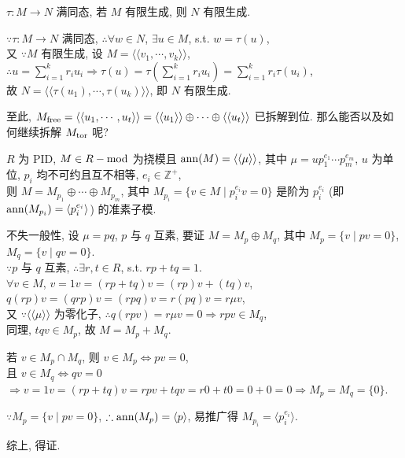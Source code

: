 \documentclass{note}
\begin{document}
\begin{cor}\label{cor-1 for thm-6.8}
    $\tau:M\rightarrow N$ 满同态, 若 $M$ 有限生成, 则 $N$ 有限生成.
\end{cor}
\begin{pf}
    $\because\tau:M\rightarrow N$ 满同态, $\therefore\forall w\in N$, $\exists u\in M$, s.t. $w=\tau(u)$,\\
    又 $\because M$ 有限生成, 设 $M=\langle\langle v_1,\cdots,v_k\rangle\rangle$, $\therefore u=\sum_{i=1}^kr_iu_i\Longrightarrow\tau(u)=\tau\left(\sum_{i=1}^kr_iu_i\right)=\sum_{i=1}^kr_i\tau(u_i)$,\\
    故 $N=\langle\langle\tau(u_1),\cdots,\tau(u_k)\rangle\rangle$, 即 $N$ 有限生成.
\end{pf}

至此, $M_{\operatorname{free}}=\langle\langle u_1,\cdots,u_t\rangle\rangle=\langle\langle u_1\rangle\rangle\oplus\cdots\oplus\langle\langle u_t\rangle\rangle$ 已拆解到位. 那么能否以及如何继续拆解 $M_{\operatorname{tor}}$ 呢?

\begin{thm}[(课本定理 6.10)]\label{thm-6.10}
    $R$ 为 PID, $M\in R-\operatorname{mod}$ 为挠模且 $\operatorname{ann}(M)=\langle\langle\mu\rangle\rangle$, 其中 $\mu=up_1^{e_1}\cdots p_m^{e_m}$, $u$ 为单位, $p_i$ 均不可约且互不相等, $e_i\in\mathbb{Z}^+$,\\
    则 $M=M_{p_1}\oplus\cdots\oplus M_{p_m}$, 其中 $M_{p_i}=\{v\in M\mid p_i^{e_i}v=0\}$ 是阶为 $p_i^{e_i}$ (即 $\operatorname{ann}(M_{p_i})=\langle p_i^{e_i}\rangle$) 的准素子模.
\end{thm}
\begin{pf}
    不失一般性, 设 $\mu=pq$, $p$ 与 $q$ 互素, 要证 $M=M_p\oplus M_q$, 其中 $M_p=\{v\mid pv=0\}$, $M_q=\{v\mid qv=0\}$.\\
    $\because p$ 与 $q$ 互素, $\therefore\exists r,t\in R$, s.t. $rp+tq=1$.\\
    $\forall v\in M$, $v=1v=(rp+tq)v=(rp)v+(tq)v$,\\
    $q(rp)v=(qrp)v=(rpq)v=r(pq)v=r\mu v$,\\
    又 $\because\langle\langle\mu\rangle\rangle$ 为零化子, $\therefore q(rpv)=r\mu v=0\Longrightarrow rpv\in M_q$,\\
    同理, $tqv\in M_p$, 故 $M=M_p+M_q$.

    若 $v\in M_p\cap M_q$, 则 $v\in M_p\Longleftrightarrow pv=0$,\\
    且 $v\in M_q\Longleftrightarrow qv=0$\\
    $\Longrightarrow v=1v=(rp+tq)v=rpv+tqv=r0+t0=0+0=0\Longrightarrow M_p=M_q=\{0\}$.

    $\because M_p=\{v\mid pv=0\}$, $\therefore\operatorname{ann}(M_{p})=\langle p\rangle$, 易推广得 $M_{p_i}=\langle p_i^{e_i}\rangle$.

    综上, 得证.
\end{pf}
\end{document}
